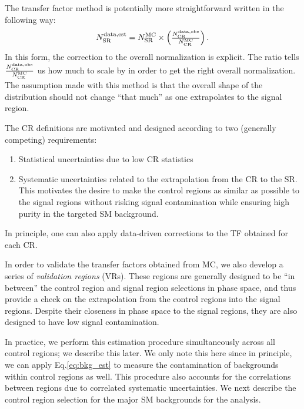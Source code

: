 The transfer factor method is potentially more straightforward written in the following way:
\begin{align}\label{eq:bkg_est_simple}
\ntext{SR}{data,est} = \ntext{SR}{MC} \times  \begin{pmatrix} \frac{\ntext{CR}{data,obs}  }{ \ntext{CR}{MC} } \end{pmatrix}.
\end{align}
In this form, the correction to the overall normalization is explicit.
The ratio tells $\frac{\ntext{CR}{data,obs}}{ \ntext{CR}{MC} }$ us how much to scale  by in order to get the right overall normalization.
The assumption made with this method is that the overall shape of the distribution should not change ``that much'' as one extrapolates to the signal region.

The CR definitions are motivated and designed according to two (generally competing) requirements:
\begin{enumerate}
\item Statistical uncertainties due to low CR statistics
\item Systematic uncertainties related to the extrapolation from the CR to the SR.  This motivates the desire to make the control regions as similar as possible to the signal regions without risking signal contamination while ensuring high purity in the targeted SM background.
\end{enumerate}
In principle, one can also apply data-driven corrections to the TF obtained for each CR.

In order to validate the transfer factors obtained from MC, we also develop a series of \textit{validation regions} (VRs).
These regions are generally designed to be ``in between'' the control region and signal region selections in phase space, and thus provide a check on the extrapolation from the control regions into the signal regions.
Despite their closeness in phase space to the signal regions, they are also designed to have low signal contamination.

In practice, we perform this estimation procedure simultaneously across all control regions; we describe this later.
We only note this here since in principle, we can apply Eq.\ref{eq:bkg_est} to measure the contamination of backgrounds within control regions as well.
This procedure also accounts for the correlations between regions due to correlated systematic uncertainties.
We next describe the control region selection for the major SM backgrounds for the analysis.

